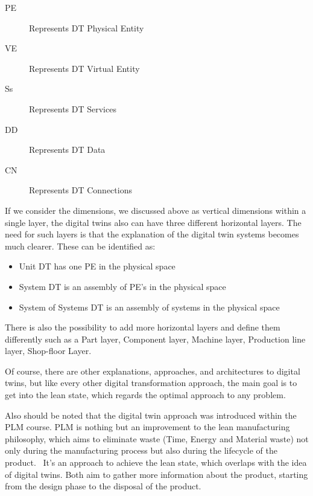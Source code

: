\documentclass[9pt,conference]{IEEEtran}
\begin{document}
    \begin{description}
        \item[PE] Represents DT Physical Entity
        \item[VE] Represents DT Virtual Entity
        \item[Ss] Represents DT Services
        \item[DD] Represents DT Data
        \item[CN] Represents DT Connections
    \end{description}
    If we consider the dimensions, we discussed above as vertical dimensions within a single layer, the digital twins also can have three different horizontal layers\cite{TAOCHAPTER1}. 
    The need for such layers is that the explanation of the digital twin systems becomes much clearer. These can be identified as:
    \begin{itemize}
        \item Unit DT has one PE in the physical space
        \item System DT is an assembly of PE's in the physical space
        \item System of Systems DT is an assembly of systems in the physical space
    \end{itemize} 

    There is also the possibility to add more horizontal layers and define them differently such as a Part layer, Component layer, Machine layer, Production line layer, Shop-floor Layer.\cite{MultiScaleModeling4Layers}
    
    Of course, there are other explanations, approaches, and architectures to digital twins, but like every other digital transformation approach, the main goal is to get into the lean state,
    which regards the optimal approach to any problem. 
    
    Also should be noted that the digital twin approach was introduced within the PLM course. PLM is nothing but an improvement to the lean manufacturing philosophy,
    which aims to eliminate waste (Time, Energy and Material waste) not only during the
    manufacturing process but also during the lifecycle of the product.~\cite{grieves2006PLM} 
    It's an approach to achieve the lean state, which overlaps with the idea of digital twins. Both aim to gather more information about the product, starting from the design phase to the disposal of the product.
    
\end{document}
